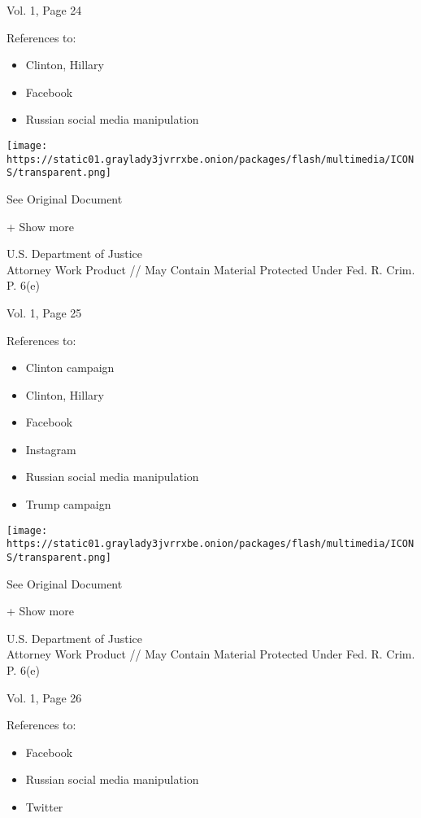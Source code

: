 Vol. 1, Page 24

References to:

\begin{itemize}
\tightlist
\item
  Clinton, Hillary
\item
  Facebook
\item
  Russian social media manipulation
\end{itemize}

\protect\hyperlink{}{}

\texttt{[image: https://static01.graylady3jvrrxbe.onion/packages/flash/multimedia/ICONS/transparent.png]}

See Original Document

+ Show more

U.S. Department of Justice\\
Attorney Work Product // May Contain Material Protected Under Fed. R.
Crim. P. 6(e)

Vol. 1, Page 25

References to:

\begin{itemize}
\tightlist
\item
  Clinton campaign
\item
  Clinton, Hillary
\item
  Facebook
\item
  Instagram
\item
  Russian social media manipulation
\item
  Trump campaign
\end{itemize}

\protect\hyperlink{}{}

\texttt{[image: https://static01.graylady3jvrrxbe.onion/packages/flash/multimedia/ICONS/transparent.png]}

See Original Document

+ Show more

U.S. Department of Justice\\
Attorney Work Product // May Contain Material Protected Under Fed. R.
Crim. P. 6(e)

Vol. 1, Page 26

References to:

\begin{itemize}
\tightlist
\item
  Facebook
\item
  Russian social media manipulation
\item
  Twitter
\end{itemize}

